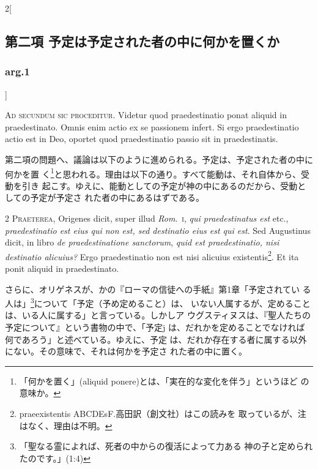 \documentclass[paper=a4paper,fontsize=10pt,jafontsize=9pt,titlepage]{jlreq}
\begin{document}

\begin{paracol}{2}[\subsection{第二項 予定は予定された者の中に何かを置くか}\subsubsection{arg.1}]

{\Huge A}{\scshape d secundum sic proceditur}. Videtur quod
praedestinatio ponat aliquid in praedestinato. Omnis enim actio ex se
passionem infert. Si ergo praedestinatio actio est in Deo, oportet quod
praedestinatio passio sit in praedestinatis.


\switchcolumn


第二項の問題へ、議論は以下のように進められる。予定は、予定された者の中に何かを置
く\footnote{「何かを置く」(aliquid ponere)とは、「実在的な変化を伴う」というほど
  の意味か。}と思われる。理由は以下の通り。すべて能動は、それ自体から、受動を引き
起こす。ゆえに、能動としての予定が神の中にあるのだから、受動としての予定が予定さ
れた者の中にあるはずである。




{\scshape 2 Praeterea}, Origenes dicit, super illud
{\itshape Rom}.~{\scshape i}, {\itshape qui praedestinatus est} etc., {\itshape praedestinatio est eius qui non
est, sed destinatio eius est qui est}. Sed Augustinus dicit, in libro {\itshape de
praedestinatione sanctorum}, {\itshape quid est praedestinatio, nisi destinatio
alicuius?} Ergo praedestinatio non est nisi alicuius
 existentis\footnote{praeexistentis ABCDEsF.高田訳（創文社）はこの読みを
 取っているが、注はなく、理由は不明。}. Et ita
ponit aliquid in praedestinato.


\switchcolumn


さらに、オリゲネスが、かの『ローマの信徒への手紙』第1章「予定されてい
る人は」\footnote{「聖なる霊によれば、死者の中からの復活によって力ある
神の子と定められたのです。」(1:4)}について「予定（予め定めること）は、
いない人属するが、定めることは、いる人に属する」と言っている。しかしア
ウグスティヌスは、『聖人たちの予定について』という書物の中で、「予定j
は、だれかを定めることでなければ何であろう」と述べている。ゆえに、予定
は、だれか存在する者に属する以外にない。その意味で、それは何かを予定さ
れた者の中に置く。



\end{paracol}
\end{document}

